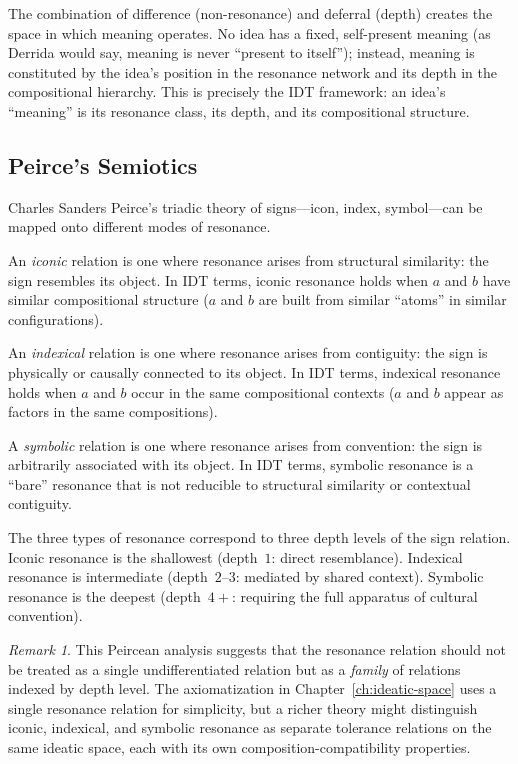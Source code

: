 \documentclass[11pt,openany]{book}
\theoremstyle{definition}
\theoremstyle{plain}
\theoremstyle{remark}
\newtheorem{remark}[axiom]{Remark}
\begin{document}
The combination of difference (non-resonance) and deferral (depth) creates the space in which meaning operates. No idea has a fixed, self-present meaning (as Derrida would say, meaning is never ``present to itself''); instead, meaning is constituted by the idea's position in the resonance network and its depth in the compositional hierarchy. This is precisely the IDT framework: an idea's ``meaning'' is its resonance class, its depth, and its compositional structure.

\subsection{Peirce's Semiotics}

Charles Sanders Peirce's triadic theory of signs---icon, index, symbol---can be mapped onto different modes of resonance.

An \emph{iconic} relation is one where resonance arises from structural similarity: the sign resembles its object. In IDT terms, iconic resonance holds when $a$ and $b$ have similar compositional structure ($a$ and $b$ are built from similar ``atoms'' in similar configurations).

An \emph{indexical} relation is one where resonance arises from contiguity: the sign is physically or causally connected to its object. In IDT terms, indexical resonance holds when $a$ and $b$ occur in the same compositional contexts ($a$ and $b$ appear as factors in the same compositions).

A \emph{symbolic} relation is one where resonance arises from convention: the sign is arbitrarily associated with its object. In IDT terms, symbolic resonance is a ``bare'' resonance that is not reducible to structural similarity or contextual contiguity.

The three types of resonance correspond to three depth levels of the sign relation. Iconic resonance is the shallowest (depth~$1$: direct resemblance). Indexical resonance is intermediate (depth~$2$--$3$: mediated by shared context). Symbolic resonance is the deepest (depth~$4+$: requiring the full apparatus of cultural convention).

\begin{remark}
This Peircean analysis suggests that the resonance relation should not be treated as a single undifferentiated relation but as a \emph{family} of relations indexed by depth level. The axiomatization in Chapter~\ref{ch:ideatic-space} uses a single resonance relation for simplicity, but a richer theory might distinguish iconic, indexical, and symbolic resonance as separate tolerance relations on the same ideatic space, each with its own composition-compatibility properties.
\end{remark}
\end{document}

